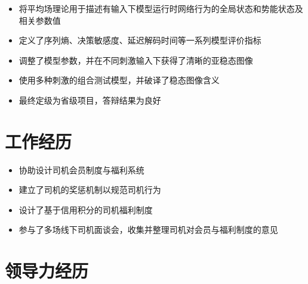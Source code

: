 \documentclass{resume}
\begin{document}

\begin{itemize}
  \item 将平均场理论用于描述有输入下模型运行时网络行为的全局状态和势能状态及相关参数值
  \item 定义了序列熵、决策敏感度、延迟解码时间等一系列模型评价指标
  \item 调整了模型参数，并在不同刺激输入下获得了清晰的亚稳态图像
  \item 使用多种刺激的组合测试模型，并破译了稳态图像含义
  \item 最终定级为省级项目，答辩结果为良好
\end{itemize}


\section{工作经历}
\begin{itemize}
  \item 协助设计司机会员制度与福利系统
  \item 建立了司机的奖惩机制以规范司机行为
  \item 设计了基于信用积分的司机福利制度
  \item 参与了多场线下司机面谈会，收集并整理司机对会员与福利制度的意见
\end{itemize}


\section{领导力经历}

\end{document}
